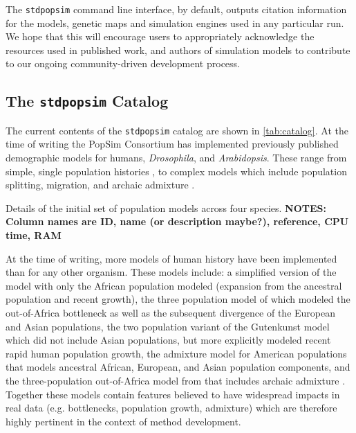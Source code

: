 \documentclass[12pt,halfline,a4paper]{ouparticle}
\newcommand{\stdpopsim}{\texttt{stdpopsim}\xspace}
\begin{document}
The \stdpopsim command line interface, by default, outputs citation information
for the models, genetic maps and simulation engines used in any particular run.
We hope that this will encourage users to appropriately acknowledge the
resources used in published work, and authors
of simulation models to contribute to our ongoing community-driven development process.

\subsection*{The \stdpopsim Catalog}
The current contents of the \stdpopsim catalog are shown in \autoref{tab:catalog}. At the time of
writing the PopSim Consortium has implemented previously published demographic models for
humans, \emph{Drosophila}, and \emph{Arabidopsis}. These range from
simple, single population histories \cite[e.g.,][]{sheehan2016deep},
to complex models which include population splitting, migration, and archaic
admixture \cite[e.g.,][]{ragsdale2019models}.

\begin{table}[t]
\begin{footnotesize}

\end{footnotesize}
\caption{\label{tab:catalog}
Details of the initial set of population models across four species.
\textbf{NOTES: Column names are ID, name (or description maybe?),
reference, CPU time, RAM}
}
\end{table}

At the time of writing, more models of human history have been implemented than for
any other organism. These models include: a simplified version of the \cite{tennessen2012evolution}
model with only the African population modeled (expansion from the ancestral
population and recent growth), the three population model of \cite{gutenkunst2009inferring}
which modeled the out-of-Africa bottleneck as well as the subsequent divergence of
the European and Asian populations, the \cite{tennessen2012evolution} two population variant of the
Gutenkunst model which did not include Asian populations, but more explicitly modeled
recent rapid human population growth, the \cite{browning2018ancestry} admixture model
for American populations that models ancestral African, European, and Asian population
components, and the three-population out-of-Africa model from \cite{ragsdale2019models} that includes archaic admixture
. Together these models
contain features believed to have widespread impacts in real data (e.g. bottlenecks, population growth,
admixture) which are therefore highly pertinent in the context of method development.
\end{document}
